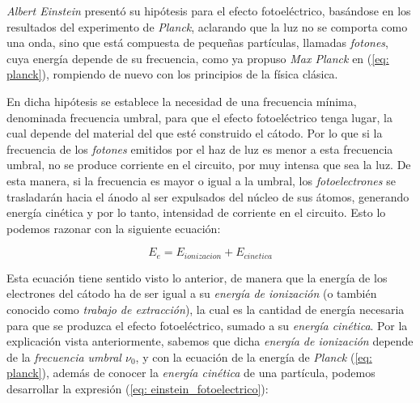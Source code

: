 \documentclass[12pt]{article}
\numberwithin{equation}{section} %
\begin{document}
        \vspace{5mm}

        \textit{Albert Einstein} presentó su hipótesis para el efecto fotoeléctrico, basándose en los resultados del experimento de \textit{Planck}, aclarando que la luz no se comporta como una onda, sino que está compuesta de pequeñas partículas, llamadas \textit{fotones}, cuya energía depende de su frecuencia, como ya propuso \textit{Max Planck} en (\ref{eq: planck}), rompiendo de nuevo con los principios de la física clásica.

        \vspace{5mm}

        En dicha hipótesis se establece la necesidad de una frecuencia mínima, denominada frecuencia umbral, para que el efecto fotoeléctrico tenga lugar, la cual depende del material del que esté construido el cátodo. Por lo que si la frecuencia de los \textit{fotones} emitidos por el haz de luz es menor a esta frecuencia umbral, no se produce corriente en el circuito, por muy intensa que sea la luz. De esta manera, si la frecuencia es mayor o igual a la umbral, los \textit{fotoelectrones} se trasladarán hacia el ánodo al ser expulsados del núcleo de sus átomos, generando energía cinética y por lo tanto, intensidad de corriente en el circuito. Esto lo podemos razonar con la siguiente ecuación:

        \vspace{5mm}

        \begin{equation}
            E_e = E_{ionizacion} + E_{cinetica}
            \label{eq: einstein_fotoelectrico}
        \end{equation}

        \vspace{5mm}

        Esta ecuación tiene sentido visto lo anterior, de manera que la energía de los electrones del cátodo ha de ser igual a su \textit{energía de ionización} (o también conocido como \textit{trabajo de extracción}), la cual es la cantidad de energía necesaria para que se produzca el efecto fotoeléctrico, sumado a su \textit{energía cinética}. Por la explicación vista anteriormente, sabemos que dicha \textit{energía de ionización} depende de la \textit{frecuencia umbral \( \nu_{0} \)}, y con la ecuación de la energía de \textit{Planck} (\ref{eq: planck}), además de conocer la \textit{energía cinética} de una partícula, podemos desarrollar la expresión (\ref{eq: einstein_fotoelectrico}):
\end{document}
